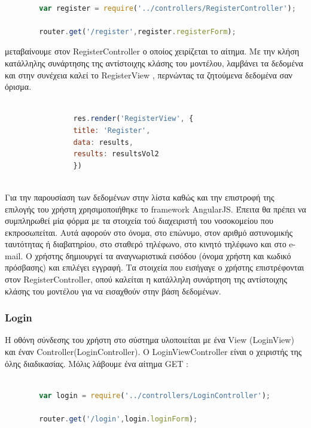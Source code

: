 		\begin{lstlisting}[language=Javascript]			
		
		var register = require('../controllers/RegisterController');
		
		router.get('/register',register.registerForm);  


		\end{lstlisting}
		

μεταβαίνουμε στον RegisterController ο οποίος χειρίζεται το αίτημα. Με την κλήση κατάλληλης συνάρτησης της αντίστοιχης κλάσης του μοντέλου, λαμβάνει τα δεδομένα και στην συνέχεια καλεί το RegisterView , περνώντας τα ζητούμενα δεδομένα σαν όρισμα.



		\begin{lstlisting}[language=Javascript]			
		
	            res.render('RegisterView', { 
                title: 'Register',
                data: results,
                results: resultsVol2
				})
				
		\end{lstlisting}


	Για την παρουσίαση των δεδομένων στην λίστα καθώς και την επιστροφή της επιλογής του χρήστη χρησιμοποιήθηκε το framework AngularJS. Έπειτα θα πρέπει να συμπληρωθεί μία φόρμα με τα στοιχεία τού διαχειριστή του νοσοκομείου που εκπροσωπείται. Αυτά αφορούν στο όνομα, στο επώνυμο, στον αριθμό αστυνομικής ταυτότητας ή διαβατηρίου, στο σταθερό τηλέφωνο, στο κινητό τηλέφωνο και στο e-mail. Ο χρήστης δημιουργεί τα αναγνωριστικά εισόδου (όνομα χρήστη και κωδικό πρόσβασης) και επιλέγει εγγραφή.  Τα στοιχεία που εισήγαγε ο χρήστης επιστρέφονται στον RegisterController, οπού καλείται η κατάλληλη συνάρτηση της αντίστοιχης κλάσης του μοντέλου για να εισαχθούν στην βάση δεδομένων.
	
	
		\subsubsection{Login}
		
	Η οθόνη σύνδεσης του χρήστη στο σύστημα υλοποιείται με ένα View (LoginView) και έναν Controller(LoginController).  O LoginViewController είναι ο χειριστής της όλης διαδικασίας. Μόλις λάβουμε ένα αίτημα GET :
		
		\begin{lstlisting}[language=Javascript]			
		
		var login = require('../controllers/LoginController');
		
		router.get('/login',login.loginForm);  


		\end{lstlisting}
		

